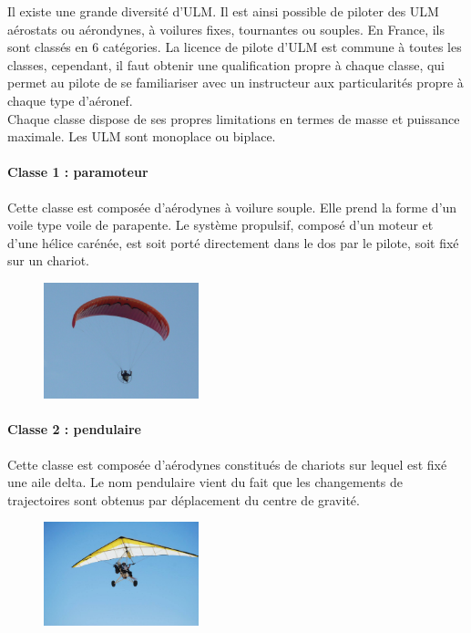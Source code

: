 Il existe une grande diversité d'ULM. Il est ainsi possible de piloter des ULM aérostats ou aérondynes, à voilures fixes, tournantes ou souples. En France, ils sont classés en 6 catégories. La licence de pilote d'ULM est commune à toutes les classes, cependant, il faut obtenir une qualification propre à chaque classe, qui permet au pilote de se familiariser avec un instructeur aux particularités propre à chaque type d'aéronef. \\

Chaque classe dispose de ses propres limitations en termes de masse et puissance maximale. Les ULM sont monoplace ou biplace.

	\paragraph{Classe 1 : paramoteur}

	Cette classe est composée d'aérodynes à voilure souple. Elle prend la forme d'un voile type voile de parapente. Le système propulsif, composé d'un moteur et d'une hélice carénée, est soit porté directement dans le dos par le pilote, soit fixé sur un chariot.  
	
	\begin{figure}[H]
  	\centering
    \includegraphics[width=0.4\textwidth]{01-EtudeAeronefs/img/ULM_Classe_1.jpg}
	\end{figure}	
	
	\paragraph{Classe 2 : pendulaire}
	Cette classe est composée d'aérodynes constitués de chariots sur lequel est fixé une aile delta. Le nom pendulaire vient du fait que les changements de trajectoires sont obtenus par déplacement du centre de gravité.	
	
	\begin{figure}[H]
  	\centering
    \includegraphics[width=0.4\textwidth]{01-EtudeAeronefs/img/ULM_Classe_2.jpg}
	\end{figure}	

